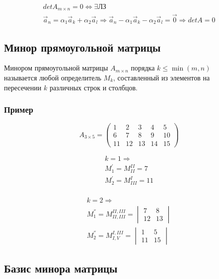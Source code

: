 \documentclass{article}
\begin{document}
\begin{gather*}
	det A_{m \times n} = 0 \Leftrightarrow \exists \text{ЛЗ} \\
	\vec{a}_n = \alpha_1 \vec{a}_k + \alpha_2 \vec{a}_l \Rightarrow
	\vec{a}_n - \alpha_1 \vec{a}_k - \alpha_2 \vec{a}_l = \vec{0} \Rightarrow det A = 0
\end{gather*}

\subsection{Минор прямоугольной матрицы}

Минором прямоугольной матрицы $A_{m \times n}$ порядка $k \le \min(m, n)$ \\
называется любой определитель $M_k$, составленный из элементов на \\
пересечении $k$ различных строк и столбцов.

\subsubsection*{Пример}

\[
A_{3 \times 5} = \begin{pmatrix}
	1 & 2 & 3 & 4 & 5 \\
	6 & 7 & 8 & 9 & 10 \\
	11 & 12 & 13 & 14 & 15
\end{pmatrix}
\]

\begin{gather*}
	k = 1 \Rightarrow \\
	M_{1}^{'} = M_{II}^{II} = 7 \\
	M_{2}^{'} = M_{III}^{I} = 11 \\
\end{gather*}

\begin{gather*}
	k = 2 \Rightarrow \\
	M_{1}^{''} = M_{II, III}^{II, III} = \begin{vmatrix}
		7 & 8 \\
		12 & 13
	\end{vmatrix} \\
	M_{2}^{''} = M_{I, V}^{I, III} = \begin{vmatrix}
		1 & 5 \\
		11 & 15
	\end{vmatrix}
\end{gather*}

\subsection{Базис минора матрицы}
\end{document}
